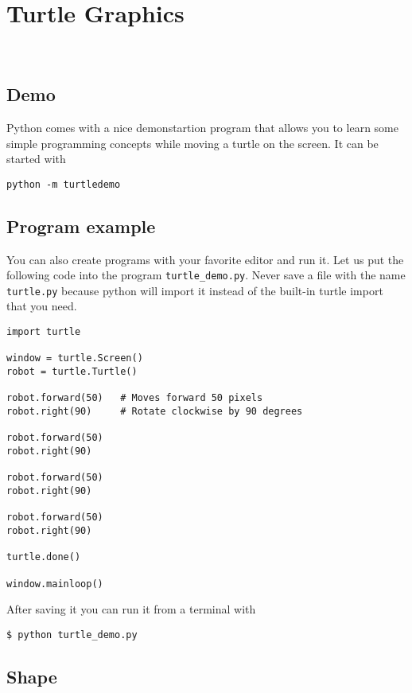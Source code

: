 

\chapter{Turtle Graphics}\label{turtle-graphics}
\FILENAME\

\section{Demo}\label{demo}

Python comes with a nice demonstartion program that allows you to learn
some simple programming concepts while moving a turtle on the screen. It
can be started with

\begin{verbatim}
python -m turtledemo
\end{verbatim}

\section{Program example}\label{program-example}

You can also create programs with your favorite editor and run it. Let
us put the following code into the program \texttt{turtle\_demo.py}.
Never save a file with the name \texttt{turtle.py} because python will
import it instead of the built-in turtle import that you need.

\begin{verbatim}
import turtle

window = turtle.Screen() 
robot = turtle.Turtle() 

robot.forward(50)   # Moves forward 50 pixels
robot.right(90)     # Rotate clockwise by 90 degrees

robot.forward(50)
robot.right(90)

robot.forward(50)
robot.right(90)

robot.forward(50)
robot.right(90)

turtle.done()

window.mainloop()
\end{verbatim}

After saving it you can run it from a terminal with

\begin{verbatim}
$ python turtle_demo.py
\end{verbatim}

\section{Shape}\label{shape}

